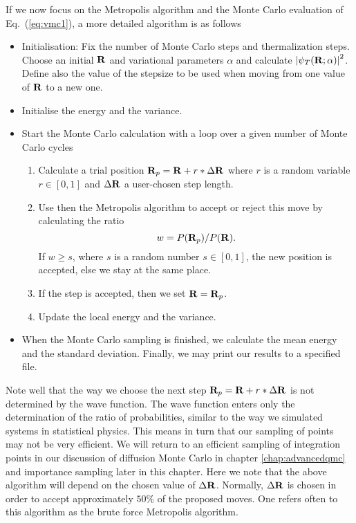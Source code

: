 If we now focus on the Metropolis algorithm and the Monte Carlo 
evaluation of Eq.~(\ref{eq:vmc1}), a more detailed algorithm is   
as follows
\begin{svgraybox}
       \begin{itemize}
          \item Initialisation: Fix the number of Monte Carlo steps and 
                thermalization steps. Choose an initial ${\bf R}$ and
                variational parameters $\alpha$ and 
                calculate
                $\left|\psi_T({\bf R};\alpha)\right|^2$. 
                Define also the value 
                of the stepsize to be used when moving from one value of 
                ${\bf R}$ to a new one.
          \item Initialise the energy and the variance.
          \item Start the Monte Carlo calculation with a loop over a given number of Monte Carlo cycles
                \begin{enumerate}
                  \item Calculate  a trial position  ${\bf R}_p={\bf R}+r*\Delta {\bf R}$
                        where $r$ is a random variable $r \in [0,1]$ and $\Delta {\bf R}$ a user-chosen 
                        step length.
                  \item Use then the Metropolis algorithm to accept
                        or reject this move by calculating the ratio
                        \[
                           w = P({\bf R}_p)/P({\bf R}).
                        \]
                        If $w \ge s$, where $s$ is a random number
                          $s \in [0,1]$, 
                          the new position is accepted, else we 
                          stay at the same place.
                  \item If the step is accepted, then we set 
                        ${\bf R}={\bf R}_p$. 
                  \item Update the local energy and the variance.
                 \end{enumerate}
          \item When the Monte Carlo sampling is finished, 
we calculate the mean energy and the standard deviation. Finally,
we may print our results to a specified file.
      \end{itemize}
\end{svgraybox}
Note well that the way we choose the next step ${\bf R}_p={\bf R}+r*\Delta {\bf R}$ 
is not determined 
by the wave function. The wave function enters only the determination of the ratio of probabilities,
similar to the way we simulated systems in statistical physics. This means in turn that our sampling of
points may not be very efficient. We will return to an efficient sampling 
of integration points in our discussion of diffusion Monte Carlo in chapter \ref{chap:advancedqmc}
and  importance sampling later in this chapter.
Here we note that the above algorithm will depend on the chosen value of $\Delta {\bf R}$.
Normally, $\Delta {\bf R}$ is chosen in order to accept approximately $50\%$ of the proposed moves. 
One refers often to this algorithm as the brute force Metropolis algorithm.

